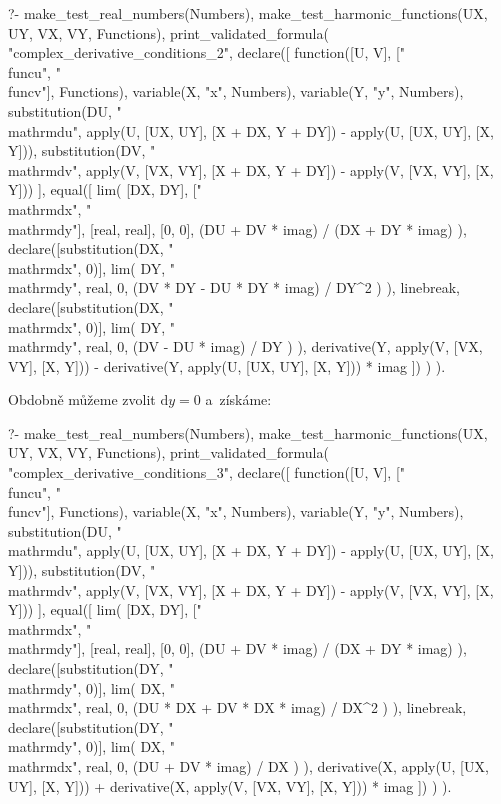 \begin{prolog}
?-	make_test_real_numbers(Numbers),
	make_test_harmonic_functions(UX, UY, VX, VY, Functions),
	print_validated_formula(
		"complex_derivative_conditions_2",
		declare([
			function([U, V], ["\\func{u}", "\\func{v}"], Functions), 
			variable(X, "x", Numbers),
			variable(Y, "y", Numbers),
			substitution(DU, "\\mathrm{d}u", apply(U, [UX, UY], [X + DX, Y + DY]) - apply(U, [UX, UY], [X, Y])),
			substitution(DV, "\\mathrm{d}v", apply(V, [VX, VY], [X + DX, Y + DY]) - apply(V, [VX, VY], [X, Y]))
		],
			equal([
				lim(
					[DX, DY], ["\\mathrm{d}x", "\\mathrm{d}y"], [real, real], [0, 0],
					(DU + DV * imag) / (DX + DY * imag)
				),
				declare([substitution(DX, "\\mathrm{d}x", 0)],
					lim(
						DY, "\\mathrm{d}y", real, 0,
						(DV * DY - DU * DY * imag) / DY^2
					)
				),
				linebreak,
				declare([substitution(DX, "\\mathrm{d}x", 0)],
					lim(
						DY, "\\mathrm{d}y", real, 0,
						(DV - DU * imag) / DY
					)
				),
				derivative(Y, apply(V, [VX, VY], [X, Y])) - derivative(Y, apply(U, [UX, UY], [X, Y])) * imag
			])
		)
	).
\end{prolog}

Obdobně můžeme zvolit \(\mathrm{d}y = 0\) a~získáme:

\begin{prolog}
?-	make_test_real_numbers(Numbers),
	make_test_harmonic_functions(UX, UY, VX, VY, Functions),
	print_validated_formula(
		"complex_derivative_conditions_3",
		declare([
			function([U, V], ["\\func{u}", "\\func{v}"], Functions), 
			variable(X, "x", Numbers),
			variable(Y, "y", Numbers),
			substitution(DU, "\\mathrm{d}u", apply(U, [UX, UY], [X + DX, Y + DY]) - apply(U, [UX, UY], [X, Y])),
			substitution(DV, "\\mathrm{d}v", apply(V, [VX, VY], [X + DX, Y + DY]) - apply(V, [VX, VY], [X, Y]))
		],
			equal([
				lim(
					[DX, DY], ["\\mathrm{d}x", "\\mathrm{d}y"], [real, real], [0, 0],
					(DU + DV * imag) / (DX + DY * imag)
				),
				declare([substitution(DY, "\\mathrm{d}y", 0)],
					lim(
						DX, "\\mathrm{d}x", real, 0,
						(DU * DX + DV * DX * imag) / DX^2
					)
				),
				linebreak,
				declare([substitution(DY, "\\mathrm{d}y", 0)],
					lim(
						DX, "\\mathrm{d}x", real, 0,
						(DU + DV * imag) / DX
					)
				),
				derivative(X, apply(U, [UX, UY], [X, Y])) + derivative(X, apply(V, [VX, VY], [X, Y])) * imag
			])
		)
	).
\end{prolog}

